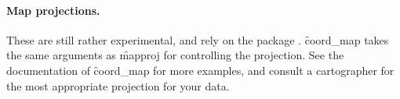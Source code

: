 % 
%


\paragraph{Map projections.}  These are still rather experimental, and rely on the  package \citep{mapproj}.  \f{coord_map} takes the same arguments as \f{mapproj} for controlling the projection.  See the documentation of \f{coord_map} for more examples, and consult a cartographer for the most appropriate projection for your data.


